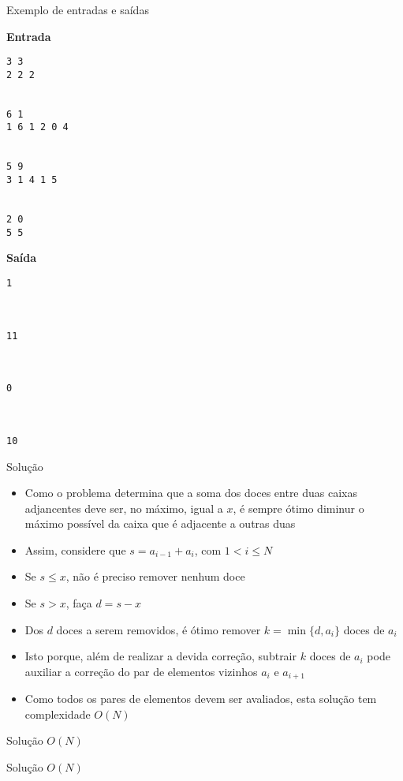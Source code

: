 \begin{frame}[fragile]{Exemplo de entradas e saídas}

\begin{minipage}[t]{0.45\textwidth}
\textbf{Entrada}
\begin{verbatim}
3 3
2 2 2


6 1
1 6 1 2 0 4


5 9
3 1 4 1 5


2 0
5 5
\end{verbatim}
\end{minipage}
\begin{minipage}[t]{0.5\textwidth}
\textbf{Saída}
\begin{verbatim}
1



11



0



10
\end{verbatim}
\end{minipage}
\end{frame}

\begin{frame}[fragile]{Solução}

    \begin{itemize}
        \item Como o problema determina que a soma dos doces entre duas caixas adjancentes
            deve ser, no máximo, igual a $x$, é sempre ótimo diminur o máximo possível
            da caixa que é adjacente a outras duas

        \item Assim, considere que $s = a_{i - 1} + a_i$, com $1 < i\leq N$

        \item Se $s \leq x$, não é preciso remover nenhum doce

        \item Se $s > x$, faça  $d = s - x$

        \item Dos $d$ doces a serem removidos, é ótimo remover $k = \min\{d, a_i\}$ doces de
            $a_i$

        \item Isto porque, além de realizar a devida correção, subtrair $k$ doces de $a_i$ pode 
            auxiliar a correção do par de elementos vizinhos $a_i$ e $a_{i + 1}$

        \item Como todos os pares de elementos devem ser avaliados, esta solução tem 
            complexidade $O(N)$
    \end{itemize}

\end{frame}

\begin{frame}[fragile]{Solução $O(N)$}
\end{frame}

\begin{frame}[fragile]{Solução $O(N)$}
\end{frame}
